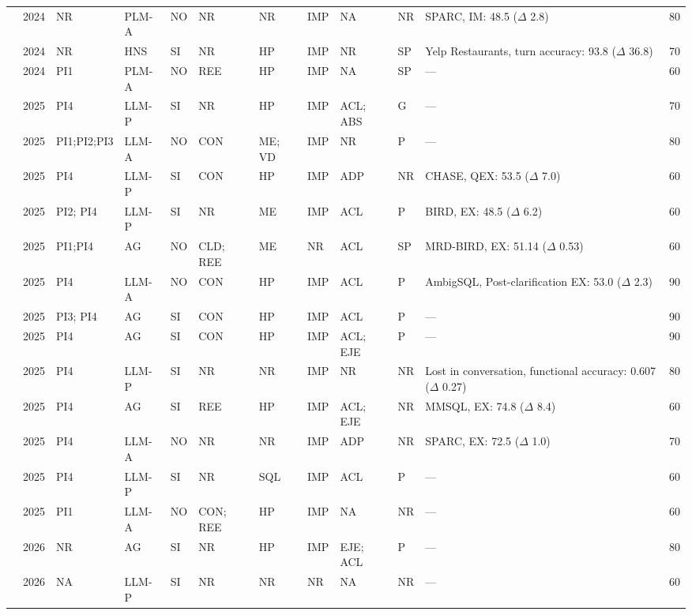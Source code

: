 {\begin{longtable}{@{}l l l l l l l l l l p{4.4cm} r@{}}
\cite{Zhang2024SEHCL} & 2024 & NR & PLM-A & NO & NR & NR & IMP & NA & NR & SPARC, IM: 48.5 ($\Delta$ 2.8) & 80 \\
\cite{Liu2024SUQL} & 2024 & NR & HNS & SI & NR & HP & IMP & NR & SP & Yelp Restaurants, turn accuracy: 93.8 ($\Delta$ 36.8) & 70 \\
\cite{Chai2023QURG} & 2024 & PI1 & PLM-A & NO & REE & HP & IMP & NA & SP & --- & 60 \\
\cite{Dong2025PRACTIQ} & 2025 & PI4 & LLM-P & SI & NR & HP & IMP & ACL; ABS & G & --- & 70 \\
\cite{Chen2025TrackSQL} & 2025 & PI1;PI2;PI3 & LLM-A & NO & CON & ME; VD & IMP & NR & P & --- & 80 \\
\cite{Xu2025AbacusSQL} & 2025 & PI4 & LLM-P & SI & CON & HP & IMP & ADP & NR & CHASE, QEX: 53.5 ($\Delta$ 7.0) & 60 \\
\cite{Urban2025Utilizing} & 2025 & PI2; PI4 & LLM-P & SI & NR & ME & IMP & ACL & P & BIRD, EX: 48.5 ($\Delta$ 6.2) & 60 \\
\cite{Jiang2025SiriusBI} & 2025 & PI1;PI4 & AG & NO & CLD; REE & ME & NR & ACL & SP & MRD-BIRD, EX: 51.14 ($\Delta$ 0.53) & 60 \\
\cite{Chen2024Learning} & 2025 & PI4 & LLM-A & NO & CON & HP & IMP & ACL & P & AmbigSQL, Post-clarification EX: 53.0 ($\Delta$ 2.3) & 90 \\
\cite{Lee2025Conversation} & 2025 & PI3; PI4 & AG & SI & CON & HP & IMP & ACL & P & --- & 90 \\
\cite{Huo2025BIRDINTERACT} & 2025 & PI4 & AG & SI & CON & HP & IMP & ACL; EJE & P & --- & 90 \\
\cite{Lin2025Prompt} & 2025 & PI4 & LLM-P & SI & NR & NR & IMP & NR & NR & Lost in conversation, functional accuracy: 0.607 ($\Delta$ 0.27) & 80 \\
\cite{Guo2025Evaluating} & 2025 & PI4 & AG & SI & REE & HP & IMP & ACL; EJE & NR & MMSQL, EX: 74.8 ($\Delta$ 8.4) & 60 \\
\cite{Almohaimeed2025Prompt} & 2025 & PI4 & LLM-A & NO & NR & NR & IMP & ADP & NR & SPARC, EX: 72.5 ($\Delta$ 1.0) & 70 \\
\cite{Menon2025FISQL} & 2025 & PI4 & LLM-P & SI & NR & SQL & IMP & ACL & P & --- & 60 \\
\cite{Ascoli2025Advancing} & 2025 & PI1 & LLM-A & NO & CON; REE & HP & IMP & NA & NR & --- & 60 \\
\cite{Sun2026Rethinking} & 2026 & NR & AG & SI & NR & HP & IMP & EJE; ACL & P & --- & 80 \\
\cite{Safarzadeh2026SPENCE} & 2026 & NA & LLM-P & SI & NR & NR & NR & NA & NR & --- & 60 \\

\end{longtable}}
